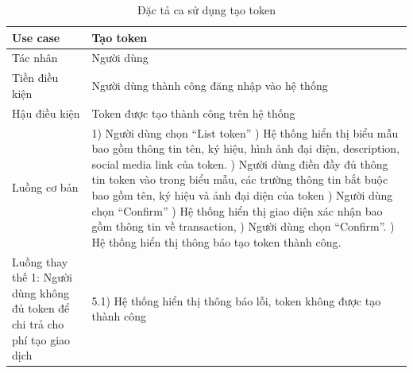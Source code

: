 \begin{table}[H]
    \centering
    \begin{tabular}{|p{5cm}|p{8cm}|}
        \hline
        Use case                                                                     & Tạo token                                    \\
        \hline
        Tác nhân                                                                     & Người dùng                                   \\
        \hline
        Tiền điều kiện                                                               & Người dùng thành công đăng nhập vào hệ thống \\
        \hline
        Hậu điều kiện                                                                & Token được tạo thành công trên hệ thống      \\
        \hline
        Luồng cơ bản                                                                 & 1) Người dùng chọn ``List token'' \newline
        2) Hệ thống hiển thị biểu mẫu bao gồm thông tin tên, ký hiệu, hình ảnh đại
        diện, description, social media link của token. \newline
        3) Người dùng điền đầy đủ thông tin token vào trong biểu mẫu, các trường thông
        tin bắt buộc bao gồm tên, ký hiệu và ảnh đại diện của token \newline
        4) Người dùng chọn ``Confirm'' \newline
        5) Hệ thống hiển thị giao diện xác nhận bao gồm thông tin về transaction,
        \newline
        6) Người dùng chọn ``Confirm''. \newline
        7) Hệ thống hiển thị thông báo tạo token thành công.                                                                        \\
        \hline
        Luồng thay thế 1: Người dùng không đủ token để chi trả cho phí tạo giao dịch &
        5.1) Hệ thống hiển thị thông báo lỗi, token không được tạo thành công                                                       \\
        \hline
    \end{tabular}
    \caption{Đặc tả ca sử dụng tạo token}
    \label{tab:create-token}
\end{table}

